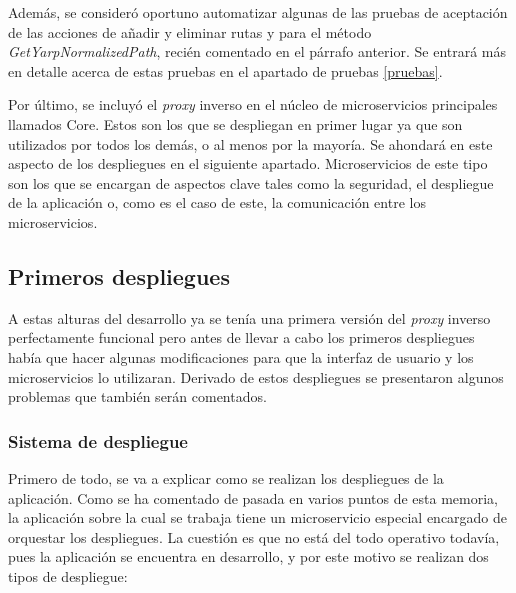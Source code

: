 \documentclass[11pt,spanish,listoffigures]{tfgetsinf}
\begin{document}
Además, se consideró oportuno automatizar algunas de las pruebas de aceptación de las acciones de añadir y eliminar rutas y para el método \emph{GetYarpNormalizedPath}, recién comentado en el párrafo anterior. Se entrará más en detalle acerca de estas pruebas en el apartado de pruebas \ref{pruebas}.

Por último, se incluyó el \emph{proxy} inverso en el núcleo de microservicios principales llamados Core. Estos son los que se despliegan en primer lugar ya que son utilizados por todos los demás, o al menos por la mayoría. Se ahondará en este aspecto de los despliegues en el siguiente apartado. Microservicios de este tipo son los que se encargan de aspectos clave tales como la seguridad, el despliegue de la aplicación o, como es el caso de este, la comunicación entre los microservicios.


		\subsection{Primeros despliegues}

A estas alturas del desarrollo ya se tenía una primera versión del \emph{proxy} inverso perfectamente funcional pero antes de llevar a cabo los primeros despliegues había que hacer algunas modificaciones para que la interfaz de usuario y los microservicios lo utilizaran. Derivado de estos despliegues se presentaron algunos problemas que también serán comentados.


			\subsubsection{Sistema de despliegue}

Primero de todo, se va a explicar como se realizan los despliegues de la aplicación. Como se ha comentado de pasada en varios puntos de esta memoria, la aplicación sobre la cual se trabaja tiene un microservicio especial encargado de orquestar los despliegues. La cuestión es que no está del todo operativo todavía, pues la aplicación se encuentra en desarrollo, y por este motivo se realizan dos tipos de despliegue:
\end{document}

